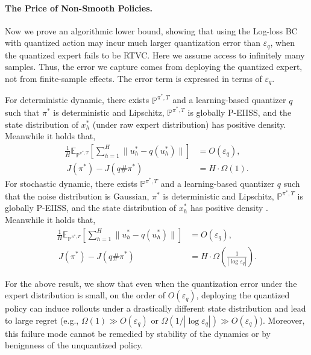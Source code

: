 \documentclass{article}
\let\oldparagraph\paragraph
\renewcommand{\paragraph}[1]{\oldparagraph{#1.}}
\begin{document}
\paragraph{The Price of Non-Smooth Policies}
Now we prove an algorithmic lower bound, showing that using the Log-loss BC with quantized action may incur much larger quantization error than $\varepsilon_q$, when the quantized expert fails to be RTVC. Here we assume access to infinitely many samples. Thus, the error we capture comes from deploying the quantized expert, not from finite-sample effects. The error term is expressed in terms of $\varepsilon_q$.

\begin{theorem}\label{thm:unsmooth_lb_deterministic}
For deterministic dynamic, there exists $\mathbb P^{\pi^*, T}$ and a learning-based quantizer $q$ such that  $\pi^*$ is deterministic and Lipschitz,  $\mathbb P^{\pi^*, T}$ is globally P-EIISS, and the state distribution of $x_h^*$ (under raw expert distribution) has positive density. Meanwhile it holds that,
    \begin{align*}
  \frac{1}{H}\mathbb E_{\mathbb P^{\pi^*, T}}\left[\sum_{h=1}^H\|u_h^*-q(u_h^*)\|\right]&=O(\varepsilon_q),\\\  J(\pi^*)-J(q\#\pi^*)&=H\cdot \Omega(1).
    \end{align*}
For stochastic dynamic, there exists $\mathbb P^{\pi^*, T}$ and a learning-based quantizer $q$ such that the noise distribution is Gaussian, $\pi^*$ is deterministic and Lipschitz,  $\mathbb P^{\pi^*, T}$ is globally P-EIISS, and the state distribution of $x_h^*$ has positive density . Meanwhile it holds that,
    \begin{align*}
        \frac{1}{H}\mathbb E_{\mathbb P^{\pi^*,T}}\left[\sum_{h=1}^H\|u_h^*-q(u_h^*)\|\right]&= O(\varepsilon_q),\\\  J(\pi^*)-J(q\#\pi^*)&=H\cdot \Omega(\frac{1}{|\log\varepsilon_q|}).
    \end{align*}
\end{theorem}

For the above result, we show that even when the quantization error under the expert distribution is small, on the order of $ O(\varepsilon_q)$, deploying the quantized policy can induce rollouts under a drastically different state distribution and lead to large regret (e.g., $ \Omega(1)\gg  O(\varepsilon_q)$ or $ \Omega(1/|\log \varepsilon_q|)\gg  O(\varepsilon_q)$). Moreover, this failure mode cannot be remedied by stability of the dynamics or by benignness of the unquantized policy.
\end{document}

